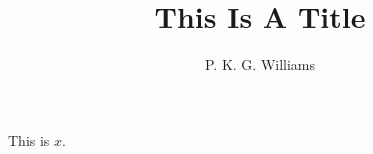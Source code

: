 \documentclass{article}
\title{This Is A Title}
\author{P. K. G. Williams}
\begin{document}
This is $x$.
\end{document}
